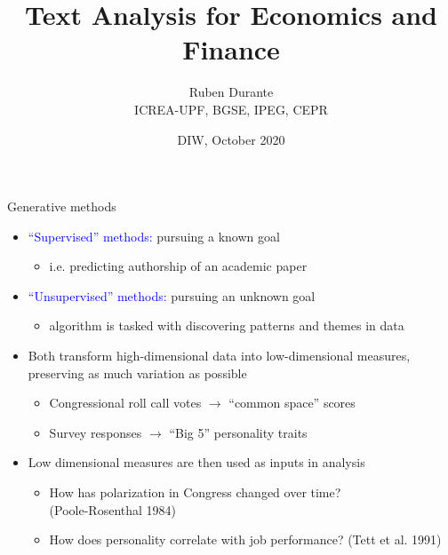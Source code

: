 \documentclass[english]{beamer}
\begin{document}
\title{\textcolor{blue(pigment)}{Text Analysis for Economics and Finance}}
\vspace{8pt} 
\author{Ruben Durante\\
\small{ICREA-UPF, BGSE, IPEG, CEPR}}
\date{\small{DIW, October 2020}}

\frame{\titlepage}
\begin{frame}{Generative methods}
\begin{itemize}
\setlength{\itemsep}{1.3em}
    \item \textcolor{blue}{``Supervised'' methods:} pursuing a known goal
    \begin{itemize}
        \item i.e. predicting authorship of an academic paper
    \end{itemize}
    \item \textcolor{blue}{``Unsupervised'' methods:} pursuing an unknown goal 
    \begin{itemize}
        \item algorithm is tasked with discovering patterns and themes in data
    \end{itemize}
    \pause
    \item Both transform high-dimensional data into low-dimensional measures, preserving as much variation as possible
    \vspace{3pt}
    \begin{itemize}
    \setlength{\itemsep}{0.4em}
        \item Congressional roll call votes $\rightarrow$ ``common space'' scores
        \item Survey responses $\rightarrow$ ``Big 5'' personality traits
    \end{itemize}
   \pause
    \item Low dimensional measures are then used as inputs in analysis
        \vspace{3pt}
    \begin{itemize}
        \setlength{\itemsep}{0.4em}
        \item How has polarization in Congress changed over time?\\(Poole-Rosenthal 1984)
        \item How does personality correlate with job performance? (Tett et al. 1991)
    \end{itemize}
    \end{itemize}
\end{frame}
\end{document}
